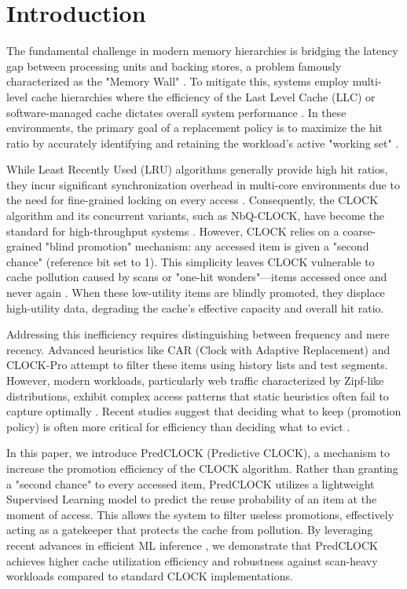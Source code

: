 \section{Introduction}
The fundamental challenge in modern memory hierarchies is bridging
the latency gap between processing units and backing stores, a
problem famously characterized as the "Memory Wall"
\cite{Wulf1995Hitting}. To mitigate this, systems employ multi-level
cache hierarchies where the efficiency of the Last Level Cache (LLC)
or software-managed cache dictates overall system performance
\cite{Prieto2011Multilevel}. In these environments, the primary goal
of a replacement policy is to maximize the hit ratio by accurately
identifying and retaining the workload's active "working set"
\cite{Denning2005Locality}.

While Least Recently Used (LRU) algorithms generally provide high hit
ratios, they incur significant synchronization overhead in multi-core
environments due to the need for fine-grained locking on every access
\cite{Herlihy2006The}. Consequently, the CLOCK algorithm and its
concurrent variants, such as NbQ-CLOCK, have become the standard for
high-throughput systems \cite{Eads2014NbQCLOCK}. However, CLOCK
relies on a coarse-grained "blind promotion" mechanism: any accessed
item is given a "second chance" (reference bit set to 1). This
simplicity leaves CLOCK vulnerable to cache pollution caused by scans
or "one-hit wonders"—items accessed once and never again
\cite{Jiang2005CLOCKPro}. When these low-utility items are blindly
promoted, they displace high-utility data, degrading the cache's
effective capacity and overall hit ratio.

Addressing this inefficiency requires distinguishing between
frequency and mere recency. Advanced heuristics like CAR (Clock with
Adaptive Replacement) \cite{Bansal2004CAR} and CLOCK-Pro
\cite{Jiang2005CLOCKPro} attempt to filter these items using history
lists and test segments. However, modern workloads, particularly web
traffic characterized by Zipf-like distributions, exhibit complex
access patterns that static heuristics often fail to capture
optimally \cite{Breslau1999Web}. Recent studies suggest that deciding
what to keep (promotion policy) is often more critical for efficiency
than deciding what to evict \cite{chen2025lazy, Yang2023FIFO}.

In this paper, we introduce PredCLOCK (Predictive CLOCK), a mechanism
to increase the promotion efficiency of the CLOCK algorithm. Rather
than granting a "second chance" to every accessed item, PredCLOCK
utilizes a lightweight Supervised Learning model to predict the reuse
probability of an item at the moment of access. This allows the
system to filter useless promotions, effectively acting as a
gatekeeper that protects the cache from pollution. By leveraging
recent advances in efficient ML inference \cite{Lin2019ONNC}, we
demonstrate that PredCLOCK achieves higher cache utilization
efficiency and robustness against scan-heavy workloads compared to
standard CLOCK implementations.
